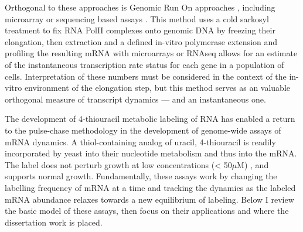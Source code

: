 Orthogonal to these approaches is Genomic Run On approaches
\parencite{garcia2004genomic}, including microarray or sequencing
based assays \parencite{pelechano2010complete}. 
This method uses a cold sarkosyl treatment to fix RNA PolII 
complexes onto genomic DNA by freezing their elongation, then
extraction and a defined in-vitro polymerase extension and profiling 
the resulting mRNA with microarrays or RNAseq allows for an estimate 
of the instantaneous transcription rate status for each gene in a 
population of cells. Interpretation of these numbers must be 
considered in the context of the in-vitro environment of the 
elongation step, but this method serves as an valuable orthogonal 
measure of transcript dynamics --- and an instantaneous one.  

The development of 4-thiouracil metabolic labeling of RNA 
\parencite{dolken2008high}
has enabled a return to the pulse-chase methodology in the 
development of genome-wide assays of mRNA dynamics. 
A thiol-containing analog of uracil, 4-thiouracil is readily
incorporated by yeast into their nucleotide metabolism and thus into
the mRNA. The label does not perturb growth at low concentrations 
(< 50$\mu$M) \parencite{burger20134}, and supports normal growth.
Fundamentally, these assays work by changing the labelling frequency 
of mRNA at a time and tracking the dynamics as the labeled
mRNA abundance relaxes towards a new equilibrium of labeling. 
Below I review the basic model of these assays, 
then focus on their applications and where
the dissertation work is placed.  


